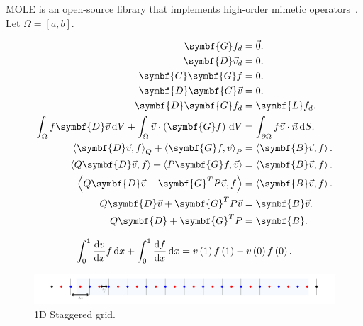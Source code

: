 MOLE is an open-source library that implements high-order mimetic
operators~\cite{Corbino2024}.
Let $\Omega=\left[a,b\right]$.

\begin{align*}
	\symbf{G}f_{d}                           & =
	\vec{0}.                                     \\
	\symbf{D}\vec{v}_{d}                     & =
	0.                                           \\
	\symbf{C}\symbf{G}f                      & =
	0.                                           \\
	\symbf{D}\symbf{C}\vec{v}                & =
	0.                                           \\
	\symbf{D}\symbf{G}f_{d}                  & =
	\symbf{L}f_{d}.                              \\
	\int_{\Omega}
	f\symbf{D}\vec{v}\dl V+
	\int_{\Omega}
	\vec{v}\cdot\left(\symbf{G}f\right)\dl V & =
	\int_{\partial\Omega}
	f\vec{v}\cdot\vec{n}\dl S.                   \\
	{\left\langle
	\symbf{D}\vec{v},
	f
	\right\rangle}_{Q}+
	{\left\langle
	\symbf{G}f,
	\vec{v}
	\right\rangle}_{P}                       & =
	\left\langle
	\symbf{B}\vec{v},
	f
	\right\rangle.                               \\
	\left\langle
	Q\symbf{D}\vec{v},
	f
	\right\rangle+
	\left\langle
	P\symbf{G}f,
	\vec{v}
	\right\rangle                            & =
	\left\langle
	\symbf{B}\vec{v},
	f
	\right\rangle.                               \\
	\left\langle
	Q\symbf{D}\vec{v}+
	\symbf{G}^{T}P\vec{v},
	f
	\right\rangle                            & =
	\left\langle
	\symbf{B}\vec{v},
	f
	\right\rangle.                               \\
	Q\symbf{D}\vec{v}+
	\symbf{G}^{T}P\vec{v}                    & =
	\symbf{B}\vec{v}.                            \\
	Q\symbf{D}+
	\symbf{G}^{T}P                           & =
	\symbf{B}.
\end{align*}

\begin{equation*}
	\int_{0}^{1}
	\diff{v}{x}f\dl x+
	\int_{0}^{1}
	\diff{f}{x}\dl x=
	v\left(1\right)f\left(1\right)-
	v\left(0\right)f\left(0\right).
\end{equation*}

\begin{figure}[ht!]
	\centering
	\includegraphics[width=0.8\paperwidth]{staggered}
	\caption{1D Staggered grid.}
\end{figure}

